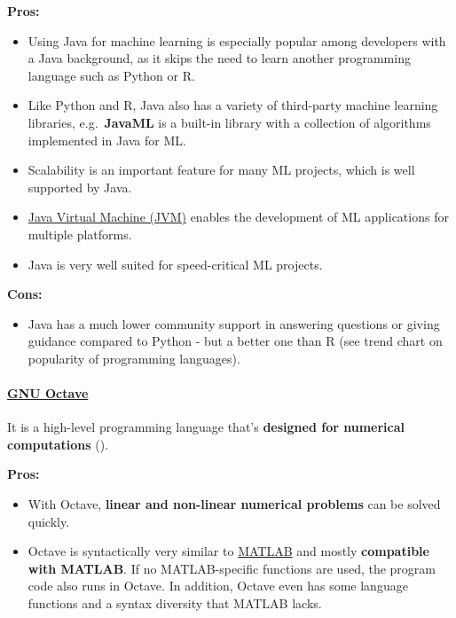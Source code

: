 \documentclass [oneside,10pt,a4paper,ngerman,BCOR10mm,headsepline,parindent,final]{scrartcl}
\providecommand{\tightlist}{%
      \setlength{\itemsep}{0pt}\setlength{\parskip}{0pt}}
\begin{document}
\textbf{Pros:}

\begin{itemize}
\tightlist
\item
  Using Java for machine learning is especially popular among developers
  with a Java background, as it skips the need to learn another
  programming language such as Python or R.
\item
  Like Python and R, Java also has a variety of third-party machine
  learning libraries, e.g.~\textbf{JavaML} is a built-in library with a
  collection of algorithms implemented in Java for ML.
\item
  Scalability is an important feature for many ML projects, which is
  well supported by Java.
\item
  \href{https://en.wikipedia.org/wiki/Java_virtual_machine}{Java Virtual
  Machine (JVM)} enables the development of ML applications for multiple
  platforms.
\item
  Java is very well suited for speed-critical ML projects.
\end{itemize}

\textbf{Cons:}

\begin{itemize}
\tightlist
\item
  Java has a much lower community support in answering questions or
  giving guidance compared to Python - but a better one than R (see
  trend chart on popularity of programming languages).
\end{itemize}

    \hypertarget{gnu-octave}{%
\paragraph{\texorpdfstring{\href{https://en.wikipedia.org/wiki/GNU_Octave}{GNU
Octave}}{GNU Octave}}\label{gnu-octave}}

It is a high-level programming language that's \textbf{designed for
numerical computations} (\cite{Octave_for_ML_2021}).

\textbf{Pros:}

\begin{itemize}
\tightlist
\item
  With Octave, \textbf{linear and non-linear numerical problems} can be
  solved quickly.
\item
  Octave is syntactically very similar to
  \href{https://en.wikipedia.org/wiki/MATLAB}{MATLAB} and mostly
  \textbf{compatible with MATLAB}. If no MATLAB-specific functions are
  used, the program code also runs in Octave. In addition, Octave even
  has some language functions and a syntax diversity that MATLAB lacks.
\end{itemize}
\end{document}
